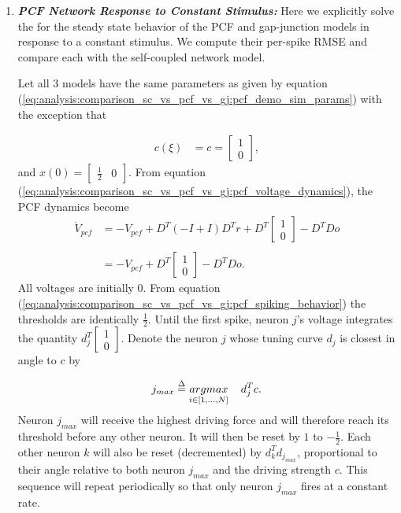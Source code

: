 \begin{enumerate}
\clearpage

\item \textbf{\textit{PCF Network Response to Constant Stimulus:}} Here we explicitly solve the for the steady state behavior of the PCF and gap-junction models in response to a constant stimulus. We compute their per-spike RMSE and compare each with the self-coupled network model. 

Let all 3 models have the same parameters as given by equation (\ref{eq:analysis:comparison_sc_vs_pcf_vs_gj:pcf_demo_sim_params}) with the exception that 

\begin{align*}
	c(\xi) &= c = 
	\begin{bmatrix}
		1 \\ 0	
	\end{bmatrix}, 
\end{align*}
and
$x(0) = \begin{bmatrix} \frac{1}{2} & 0 \end{bmatrix}$. From equation (\ref{eq:analysis:comparison_sc_vs_pcf_vs_gj:pcf_voltage_dynamics}), the PCF dynamics become
\begin{align*}
	\dot{V}_{pcf}
	&=
	- V_{pcf}
	+
	D^T 
	\left(
		-I + I
	\right)
	D^T r
	+
	D^T 
	\begin{bmatrix}
		1 \\ 0
	\end{bmatrix}
	-
	D^T D o
	\\
	\\
	&= 
	-V_{pcf}
	+ 
	D^T 
	\begin{bmatrix}
		1 \\ 0
	\end{bmatrix}
	-
	D^T D o.
\end{align*}
All voltages are initially 0. From equation (\ref{eq:analysis:comparison_sc_vs_pcf_vs_gj:pcf_spiking_behavior}) the thresholds are identically $\frac{1}{2}$. Until the first spike, neuron $j$'s voltage integrates the quantity $d_j^T 	\begin{bmatrix}	1 \\ 0	\end{bmatrix}$. Denote the neuron $j$ whose tuning curve $d_j$ is closest in angle to $c$ by 

\begin{align*}
	j_{max} \overset{\Delta}{=}
	 \underset{
	 	i \in 
	 	\left[
	 		1, \ldots, N
	 	\right]
	 }
	 {argmax}
	 \hspace{4mm}
	 	d_j^T c.
\end{align*}
Neuron $j_{max}$ will receive the highest driving force and will therefore reach its threshold  before any other neuron. It will then be reset by $1$ to $- \frac{1}{2}$. Each other neuron $k$ will also be reset (decremented) by $d_k^T d_{j_{max}}$, proportional to their angle relative to both neuron $j_{max}$ and the driving strength $c$. This sequence will repeat periodically so that only neuron $j_{max}$ fires at a constant rate. 


\end{enumerate}
